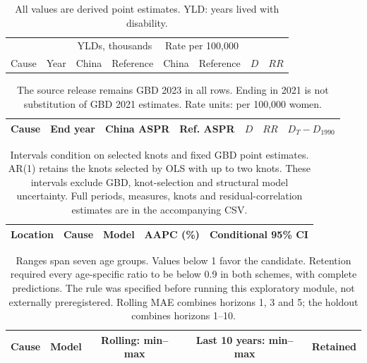 \documentclass[11pt,a4paper]{article}
\begin{document}
\begin{table}[htbp]\centering\small
\caption{Restricted-age standardized YLD rates and YLD totals.}\label{tab:yld}
\setlength{\tabcolsep}{3.5pt}
\begin{tabular}{llrrrrrr}\toprule
 & & \multicolumn{2}{c}{YLDs, thousands} & \multicolumn{2}{c}{Rate per 100,000} & & \\
Cause & Year & China & Reference & China & Reference & $D$ & $RR$\\\midrule
\end{tabular}
\caption*{All values are derived point estimates. YLD: years lived with disability.}
\end{table}
\begin{table}[htbp]\centering\small
\caption{Endpoint sensitivity added after inspection of terminal-year estimates.}\label{tab:endpoint}
\begin{tabular}{llrrrrr}\toprule
Cause & End year & China ASPR & Ref. ASPR & $D$ & $RR$ & $D_T-D_{1990}$\\\midrule
\end{tabular}
\caption*{The source release remains GBD 2023 in all rows. Ending in 2021 is not substitution of GBD 2021 estimates. Rate units: per 100,000 women.}
\end{table}
\begin{table}[htbp]\centering\small
\caption{Conditional trend sensitivity for prevalence, 1990--2023.}\label{tab:trends}
\begin{tabular}{lllrr}\toprule
Location & Cause & Model & AAPC (\%) & Conditional 95\% CI\\\midrule
\end{tabular}
\caption*{Intervals condition on selected knots and fixed GBD point estimates. AR(1) retains the knots selected by OLS with up to two knots. These intervals exclude GBD, knot-selection and structural model uncertainty. Full periods, measures, knots and residual-correlation estimates are in the accompanying CSV.}
\end{table}
\begin{table}[htbp]\centering\small
\caption{Age-specific forecast-validation MAE ratios relative to the naive baseline.}\label{tab:forecast}
\begin{tabular}{llccc}\toprule
Cause & Model & Rolling: min--max & Last 10 years: min--max & Retained\\\midrule
\end{tabular}
\caption*{Ranges span seven age groups. Values below 1 favor the candidate. Retention required every age-specific ratio to be below 0.9 in both schemes, with complete predictions. The rule was specified before running this exploratory module, not externally preregistered. Rolling MAE combines horizons 1, 3 and 5; the holdout combines horizons 1--10.}
\end{table}
\end{document}
